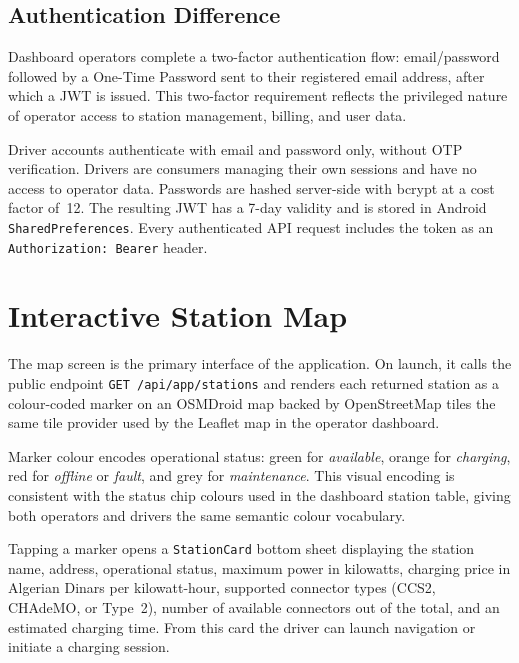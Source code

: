 \documentclass[12pt,a4paper]{report}
\begin{document}
\subsection{Authentication Difference}

Dashboard operators complete a two-factor authentication flow: email/password followed by a
One-Time Password sent to their registered email address, after which a JWT is issued. This
two-factor requirement reflects the privileged nature of operator access to station management,
billing, and user data.

\begin{sloppypar}
Driver accounts authenticate with email and password only, without OTP verification. Drivers
are consumers managing their own sessions and have no access to operator data. Passwords are
hashed server-side with bcrypt at a cost factor of~12. The resulting JWT has a 7-day validity
and is stored in Android \texttt{SharedPreferences}. Every authenticated API request includes
the token as an \texttt{Authorization: Bearer} header.
\end{sloppypar}

\section{Interactive Station Map}

\begin{sloppypar}
The map screen is the primary interface of the application. On launch, it calls the public
endpoint \texttt{GET /api/app/stations} and renders each returned station as a colour-coded
marker on an OSMDroid map backed by OpenStreetMap tiles the same tile provider used by the
Leaflet map in the operator dashboard.
\end{sloppypar}

Marker colour encodes operational status: green for \textit{available}, orange for
\textit{charging}, red for \textit{offline} or \textit{fault}, and grey for
\textit{maintenance}. This visual encoding is consistent with the status chip colours used in
the dashboard station table, giving both operators and drivers the same semantic colour
vocabulary.

Tapping a marker opens a \texttt{StationCard} bottom sheet displaying the station name,
address, operational status, maximum power in kilowatts, charging price in Algerian Dinars per
kilowatt-hour, supported connector types (CCS2, CHAdeMO, or Type~2), number of available
connectors out of the total, and an estimated charging time. From this card the driver can
launch navigation or initiate a charging session.
\end{document}

